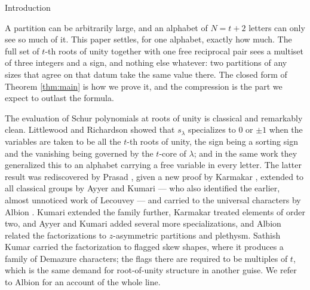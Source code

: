 \documentclass[11pt,reqno]{amsart}
\makeatletter
\renewcommand\section{\@startsection{section}{1}%
  \z@{\linespacing\@plus\linespacing}{.5\linespacing}%
  {\normalfont\large\bfseries\centering}}
\theoremstyle{plain}
\theoremstyle{definition}
\makeatother
\begin{document}
\begin{abstract}
A last section treats the zero locus, which survives further pairs. Two conditions make
$\Psi_r=s_\lambda(1,-1,z_1^{\pm1},\dots,z_r^{\pm1})$ vanish: the beta set having constant parity, and
$\lambda$ being self-complementary of odd width. That direction is a corollary of the complementation
identity over an index family Ayyer and Behrend single out. The new content is the converse, that
nothing else vanishes, proved for one pair, for every $r$ inside Littlewood's range, and for every
$r$ when $|\lambda|\le2r+2$. The rest is conjectural, verified over every shape in the tabulated
ranges.
\fi
\end{abstract}

\maketitle

\section{Introduction}

A partition can be arbitrarily large, and an alphabet of $N=t+2$ letters can only see so much
of it. This paper settles, for one alphabet, exactly how much. The full set of $t$-th roots of
unity together with one free reciprocal pair sees a multiset of three integers and a sign, and
nothing else whatever: two partitions of any sizes that agree on that datum take the same value
there. The closed form of Theorem \ref{thm:main} is how we prove it, and the compression is the
part we expect to outlast the formula.

The evaluation of Schur polynomials at roots of unity is classical and remarkably clean. Littlewood
and Richardson \cite{LR34} showed that $s_\lambda$ specializes to $0$ or $\pm1$ when the variables
are taken to be all the $t$-th roots of unity, the sign being a sorting sign and the vanishing being
governed by the $t$-core of $\lambda$; and in the same work they generalized this to an alphabet
carrying a free variable in every letter. The latter result was rediscovered by Prasad \cite{Pra16},
given a new proof by Karmakar \cite{Kar22}, extended to all classical groups by Ayyer and Kumari
\cite{AK22} --- who also identified the earlier, almost unnoticed work of Lecouvey \cite{Lec09} ---
and carried to the universal characters by Albion \cite{Alb23}. Kumari \cite{Kum24} extended the
family further, Karmakar \cite{Kar24} treated elements of order two, and Ayyer and Kumari
\cite{AK25} added several more specializations, and Albion \cite{Alb25} related the factorizations to
$z$-asymmetric partitions and plethysm. Sathish Kumar \cite{SK23} carried the factorization to
flagged skew shapes, where it produces a family of Demazure characters; the flags there are
required to be multiples of $t$, which is the same demand for root-of-unity structure in another
guise. We refer to Albion \cite{Alb23} for an account of the whole
line.
\end{document}

